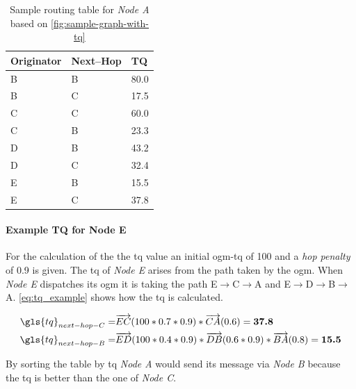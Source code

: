\begin{table}[htb!]
  \centering
  \begin{tabu} to \textwidth {X[c]X[c]X[c]}
		\toprule
    		\textbf{Originator} & \textbf{Next–Hop} & \textbf{TQ} \\
		\midrule
		B & B & 80.0 \\
		B & C & 17.5\\
		C & C & 60.0 \\
		C & B & 23.3 \\
		D & B & 43.2\\
		D & C & 32.4\\
		E & B & 15.5 \\
		E & C & 37.8 \\
		\bottomrule 
	\end{tabu}
\caption{Sample routing table for \textit{Node A} based on \cref{fig:sample-graph-with-tq}}
\label{tbl:sample-tq-table}
\end{table}

\paragraph{Example TQ for Node E}
For the calculation of the the \gls{tq} value an initial \gls{ogm}-\gls{tq} of 100 and a \textit{hop penalty} of 0.9 is given.
The \gls{tq} of \textit{Node E} arises from the path taken by the \gls{ogm}.
When \textit{Node E} dispatches its \gls{ogm} it is taking the path E$\rightarrow$C$\rightarrow$A and E$\rightarrow$D$\rightarrow$B$\rightarrow$A. \vref{eq:tq_example} shows how the \gls{tq} is calculated.

\begin{equation}
\label{eq:tq_example}
\begin{aligned}
\gls{tq} _{next-hop-C} = & \overrightarrow{EC} (100 * 0.7 * 0.9) * \overrightarrow{CA} (0.6) = \textbf{37.8} \\
\gls{tq} _{next-hop-B} = & \overrightarrow{ED} (100 * 0.4 * 0.9) * \overrightarrow{DB} (0.6 * 0.9) * \overrightarrow{BA} (0.8) = \textbf{15.5}
\end{aligned}
\end{equation}

By sorting the table by \gls{tq} \textit{Node A} would send its message via \textit{Node B} because the \gls{tq} is better than the one of \textit{Node C}.
